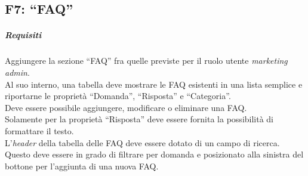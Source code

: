 \subsection{F7: “FAQ”}
\subparagraph{Requisiti}
Aggiungere la sezione “FAQ” fra quelle previste per il ruolo utente \textit{marketing admin}.\\
Al suo interno, una tabella deve mostrare le FAQ esistenti in una lista semplice e riportarne le proprietà “Domanda”, “Risposta” e “Categoria”.\\
Deve essere possibile aggiungere, modificare o eliminare una FAQ.\\
Solamente per la proprietà “Risposta” deve essere fornita la possibilità di formattare il testo.\\
L'\textit{header} della tabella delle FAQ deve essere dotato di un campo di ricerca. Questo deve essere in grado di filtrare per domanda e posizionato alla sinistra del bottone per l'aggiunta di una nuova FAQ.






